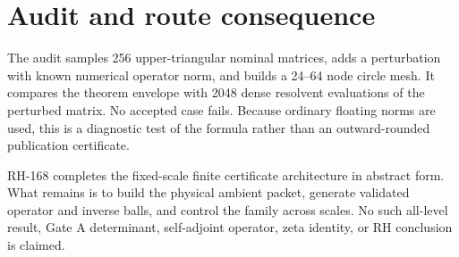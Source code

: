 \documentclass[12pt]{article}
\begin{document}
\section{Audit and route consequence}
The audit samples 256 upper-triangular nominal matrices, adds a perturbation
with known numerical operator norm, and builds a 24--64 node circle mesh.  It
compares the theorem envelope with 2048 dense resolvent evaluations of the
perturbed matrix.  No accepted case fails.  Because ordinary floating norms
are used, this is a diagnostic test of the formula rather than an
outward-rounded publication certificate.

RH-168 completes the fixed-scale finite certificate architecture in abstract
form.  What remains is to build the physical ambient packet, generate
validated operator and inverse balls, and control the family across scales.
No such all-level result, Gate A determinant, self-adjoint operator, zeta
identity, or RH conclusion is claimed.



\end{document}
